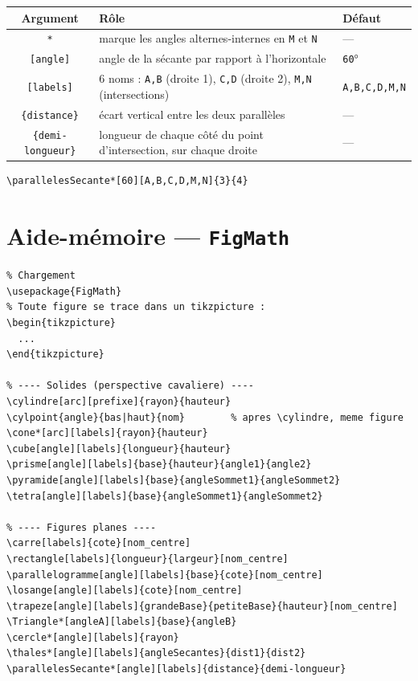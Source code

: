 \documentclass[11pt,a4paper]{article}
\begin{document}
\begin{center}
\begin{tabular}{@{}cll@{}}
\toprule
\textbf{Argument} & \textbf{Rôle} & \textbf{Défaut} \\
\midrule
\texttt{*} & marque les angles alternes-internes en \texttt{M} et \texttt{N} & --- \\
\texttt{[angle]} & angle de la sécante par rapport à l'horizontale & \texttt{60}° \\
\texttt{[labels]} & 6 noms : \texttt{A,B} (droite 1), \texttt{C,D} (droite 2), \texttt{M,N} (intersections) & \texttt{A,B,C,D,M,N} \\
\texttt{\{distance\}} & écart vertical entre les deux parallèles & --- \\
\texttt{\{demi-longueur\}} & longueur de chaque côté du point d'intersection, sur chaque droite & --- \\
\bottomrule
\end{tabular}
\end{center}

\begin{lstlisting}
\parallelesSecante*[60][A,B,C,D,M,N]{3}{4}
\end{lstlisting}

\section{Aide-mémoire --- \texttt{FigMath}}

\begin{lstlisting}
% Chargement
\usepackage{FigMath}
% Toute figure se trace dans un tikzpicture :
\begin{tikzpicture}
  ...
\end{tikzpicture}

% ---- Solides (perspective cavaliere) ----
\cylindre[arc][prefixe]{rayon}{hauteur}
\cylpoint{angle}{bas|haut}{nom}        % apres \cylindre, meme figure
\cone*[arc][labels]{rayon}{hauteur}
\cube[angle][labels]{longueur}{hauteur}
\prisme[angle][labels]{base}{hauteur}{angle1}{angle2}
\pyramide[angle][labels]{base}{angleSommet1}{angleSommet2}
\tetra[angle][labels]{base}{angleSommet1}{angleSommet2}

% ---- Figures planes ----
\carre[labels]{cote}[nom_centre]
\rectangle[labels]{longueur}{largeur}[nom_centre]
\parallelogramme[angle][labels]{base}{cote}[nom_centre]
\losange[angle][labels]{cote}[nom_centre]
\trapeze[angle][labels]{grandeBase}{petiteBase}{hauteur}[nom_centre]
\Triangle*[angleA][labels]{base}{angleB}
\cercle*[angle][labels]{rayon}
\thales*[angle][labels]{angleSecantes}{dist1}{dist2}
\parallelesSecante*[angle][labels]{distance}{demi-longueur}
\end{lstlisting}
\end{document}
